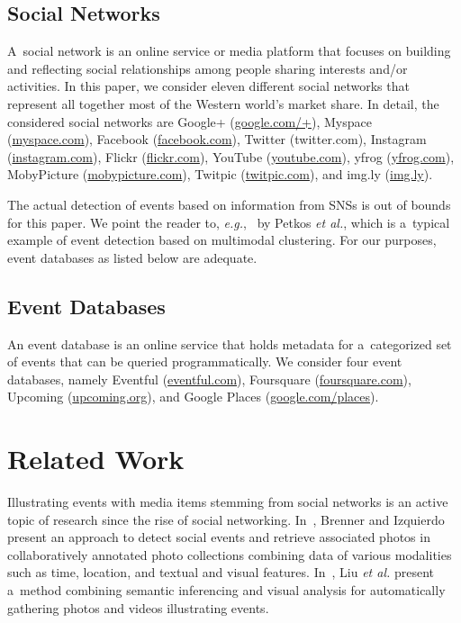 \documentclass{acm_proc_article-sp}
\let\oldemph\emph
\renewcommand{\emph}[1]{\oldemph{\fontsize{9}{9}\selectfont #1}}
\begin{document}
\subsection{Social Networks} \label{sec:social-networks}
A~social network is an online service or media platform that focuses on building
and reflecting social relationships among people sharing interests and/or activities.
In this paper, we consider eleven different social networks
that represent all together most of the Western world's market share.
In detail, the considered social networks are
\mbox{Google+} (\url{google.com/+}),
Myspace (\url{myspace.com}),
Facebook (\url{facebook.com}),
Twitter ({twitter.com}),
Instagram (\url{instagram.com}),
Flickr (\url{flickr.com}),
YouTube (\url{youtube.com}),
yfrog (\url{yfrog.com}),
MobyPicture (\url{mobypicture.com}),
Twitpic (\url{twitpic.com}), and
\mbox{img.ly} (\url{img.ly}).

The actual detection of events based on information from SNSs
is out of bounds for this paper.
We point the reader to, \emph{e.g.},~\cite{Petkos2012} by Petkos \emph{et al.},
which is a~typical example of event detection based on multimodal clustering.
For our purposes, event databases as listed below are adequate.
 
\subsection{Event Databases}
An event database is an online service that holds metadata
for a~categorized set of events that can be queried programmatically.
We consider four event databases, namely
Eventful (\url{eventful.com}),
Foursquare (\url{foursquare.com}),
Upcoming (\url{upcoming.org}), and
Google Places (\url{google.com/places}).

\section{Related Work}
Illustrating events with media items stemming from social networks
is an active topic of research since the rise of social networking.
In~\cite{Brenner2012}, Brenner and Izquierdo present
an approach to detect social events and retrieve associated photos
in collaboratively annotated photo collections combining data of various modalities
such as time, location, and textual and visual features.
In~\cite{Liu2011}, Liu \emph{et al.} present a~method
combining semantic inferencing and visual analysis for automatically gathering
photos and videos illustrating events.
\end{document}

